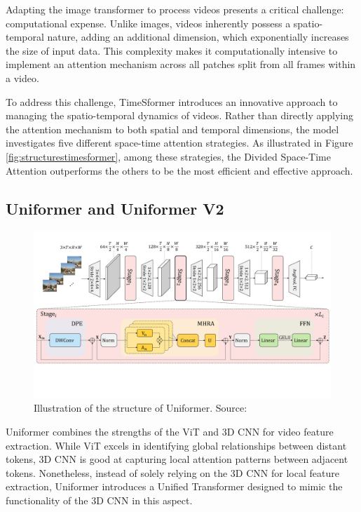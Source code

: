 Adapting the image transformer to process videos presents a critical challenge: computational expense. Unlike images, videos inherently possess a spatio-temporal nature, adding an additional dimension, which exponentially increases the size of input data. This complexity makes it computationally intensive to implement an attention mechanism across all patches split from all frames within a video.

To address this challenge, TimeSformer introduces an innovative approach to managing the spatio-temporal dynamics of videos. Rather than directly applying the attention mechanism to both spatial and temporal dimensions, the model investigates five different space-time attention strategies. As illustrated in Figure \ref{fig:structurestimesformer}, among these strategies, the Divided Space-Time Attention outperforms the others to be the most efficient and effective approach.


\subsection{Uniformer and Uniformer V2}
\label{sec:rw_uniformer}
\begin{figure}[ht]
    \centering
    \includegraphics[width=1.0\textwidth]{assets/charts_rw/Uniformer}
    \caption[The Structure of Uniformer]{Illustration of the structure of Uniformer. Source: \parencite{li2022uniformer}}
    \label{fig:structureuniformer}
\end{figure}

Uniformer combines the strengths of the ViT and 3D CNN for video feature extraction. While ViT excels in identifying global relationships between distant tokens, 3D CNN is good at capturing local attention patterns between adjacent tokens. Nonetheless, instead of solely relying on the 3D CNN for local feature extraction, Uniformer introduces a Unified Transformer designed to mimic the functionality of the 3D CNN in this aspect.


